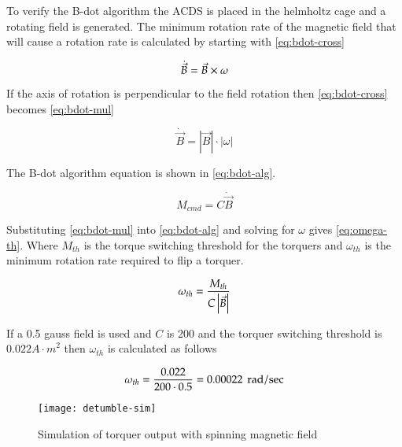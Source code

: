 To verify the B-dot algorithm the \ac{ACDS} is placed in the helmholtz cage and a rotating field is generated. The minimum rotation rate of the magnetic field that will cause a rotation rate is calculated by starting with \cref{eq:bdot-cross}

\begin{equation}
    \dot{\vec{B}} = \vec{B} \times \omega
    \label{eq:bdot-cross}
\end{equation}

If the axis of rotation is perpendicular to the field rotation then \cref{eq:bdot-cross} becomes \cref{eq:bdot-mul}

\begin{equation}
    \dot{\vec{B}} = \left| \vec{B} \right| \cdot \left| \omega \right|
    \label{eq:bdot-mul}
\end{equation}

The B-dot algorithm equation is shown in \cref{eq:bdot-alg}.

\begin{equation}
    M_{cmd} = C \dot{\vec{B}} 
    \label{eq:bdot-alg}
\end{equation}

Substituting \cref{eq:bdot-mul} into \cref{eq:bdot-alg} and solving for $\omega$ gives \cref{eq:omega-th}. Where $M_{th}$ is the torque switching threshold for the torquers and $\omega_{th}$ is the minimum rotation rate required to flip a torquer.

\begin{equation}
    \omega _ {th} = {M _ {th} \over{ {C \left| \vec{B} \right|}}}
    \label{eq:omega-th}
\end{equation}

If a 0.5 gauss field is used and $C$ is 200 and the torquer switching threshold is $0.022 \unit{A \cdot m} ^2$ then $\omega_{th}$ is calculated as follows

\begin{equation}
    \omega _ {th} = { 0.022 \over{ {200 \cdot 0.5}}} = 0.00022 ~ \, \mathrm{rad / sec}
\end{equation}

\begin{figure}[!ht]
    \centering
    \texttt{[image: detumble-sim]}
  \caption{Simulation of torquer output with spinning magnetic field}
    \label{fig:detumble-sim}
\end{figure}


